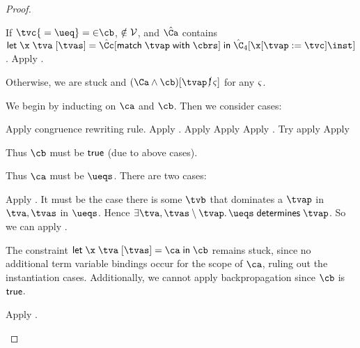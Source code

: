 \documentclass[acmsmall,screen,nonacm,review]{acmart}
\begin{document}
\begin{proof}
\begin{proofcases}
\begin{proofcases}
\begin{proofcases}
	    If $\cunif \tvc {\cunif \t \ueq} \in \cb$, $\relax \notin \mathcal{V}$, and $\hat\Ca$ contains $\cletr \x \tv \tvs {\hat\Cc\where{\cmatch \tvp \cbrs}} {\hat\C_4\where{\cpapp \x \tvp \tvc \inst}}$.
	    Apply .

	    Otherwise, we are stuck and $\nCshape {(\Ca \cand \cb)} \tvp \sh$ for any $\varsigma$.
	\end{proofcases}

    \end{proofcases}

    \proofcase{$\cletr \x \tv \tvs \ca \cb$}
    We begin by inducting on $\ca$ and $\cb$. Then we consider cases:
    \begin{proofcases}
       Apply congruence rewriting rule.
       Apply .
       Apply 
       Apply 
       Apply .
       Try apply 
       Apply 

	Thus $\cb$ must be $\mathsf{true}$ (due to above cases).
	\begin{proofcases}
	    Thus $\ca$ must be $\ueqs$. There are two cases:
	    \begin{itemize}
	      \proofcase{$\cexists {\tv, \tvs} \ueqs \cequiv \ctrue$} Apply .
	      \proofcase{$\cexists {\tv, \tvs} \ueqs \cnequiv \ctrue$} It must be the case there is some $\tvb$ that dominates a $\tvp$ in $\tv, \tvs$ in $\ueqs$.
		Hence $\cdetermines {\cexists {\tv, \tvs \setminus \tvp} \ueqs} \tvp$.
		So we can apply .
	    \end{itemize}

	    The constraint $\cletr \x \tv \tvs \ca \cb$ remains stuck, since
	    no additional term variable bindings occur for the scope of $\ca$,
	    ruling out the instantiation cases. Additionally, we cannot apply
	    backpropagation since $\cb$ is $\mathsf{true}$.
	\end{proofcases}

	\begin{proofcases}
	  \proofcase{$\hat\C\where{\capp \x \t}$} Apply \Rule{S-Let-AppR}.


\end{proofcases}
\end{proofcases}
\end{proofcases}
\end{proof}
\end{document}
